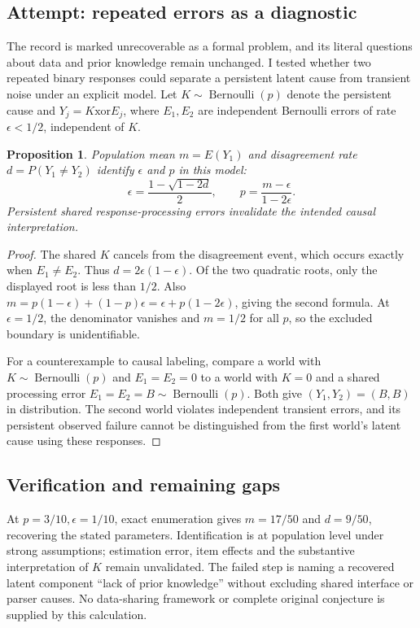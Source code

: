 \documentclass[11pt]{article}
\newtheorem{proposition}{Proposition}
\begin{document}
\subsection{Attempt: repeated errors as a diagnostic}
The record is marked unrecoverable as a formal problem, and its literal questions about data and prior knowledge remain unchanged. I tested whether two repeated binary responses could separate a persistent latent cause from transient noise under an explicit model. Let $K\sim\operatorname{Bernoulli}(p)$ denote the persistent cause and $Y_j=K\mathbin{\mathrm{xor}}E_j$, where $E_1,E_2$ are independent Bernoulli errors of rate $\epsilon<1/2$, independent of $K$.
\begin{proposition}
Population mean $m=E(Y_1)$ and disagreement rate $d=P(Y_1\ne Y_2)$ identify $\epsilon$ and $p$ in this model:
\[
\epsilon=\frac{1-\sqrt{1-2d}}2,\qquad p=\frac{m-\epsilon}{1-2\epsilon}.
\]
Persistent shared response-processing errors invalidate the intended causal interpretation.
\end{proposition}
\begin{proof}
The shared $K$ cancels from the disagreement event, which occurs exactly when $E_1\ne E_2$. Thus $d=2\epsilon(1-\epsilon)$. Of the two quadratic roots, only the displayed root is less than $1/2$. Also $m=p(1-\epsilon)+(1-p)\epsilon=\epsilon+p(1-2\epsilon)$, giving the second formula. At $\epsilon=1/2$, the denominator vanishes and $m=1/2$ for all $p$, so the excluded boundary is unidentifiable.

For a counterexample to causal labeling, compare a world with $K\sim\operatorname{Bernoulli}(p)$ and $E_1=E_2=0$ to a world with $K=0$ and a shared processing error $E_1=E_2=B\sim\operatorname{Bernoulli}(p)$. Both give $(Y_1,Y_2)=(B,B)$ in distribution. The second world violates independent transient errors, and its persistent observed failure cannot be distinguished from the first world's latent cause using these responses.
\end{proof}
\subsection{Verification and remaining gaps}
At $p=3/10,\epsilon=1/10$, exact enumeration gives $m=17/50$ and $d=9/50$, recovering the stated parameters. Identification is at population level under strong assumptions; estimation error, item effects and the substantive interpretation of $K$ remain unvalidated. The failed step is naming a recovered latent component ``lack of prior knowledge'' without excluding shared interface or parser causes. No data-sharing framework or complete original conjecture is supplied by this calculation.
\end{document}
